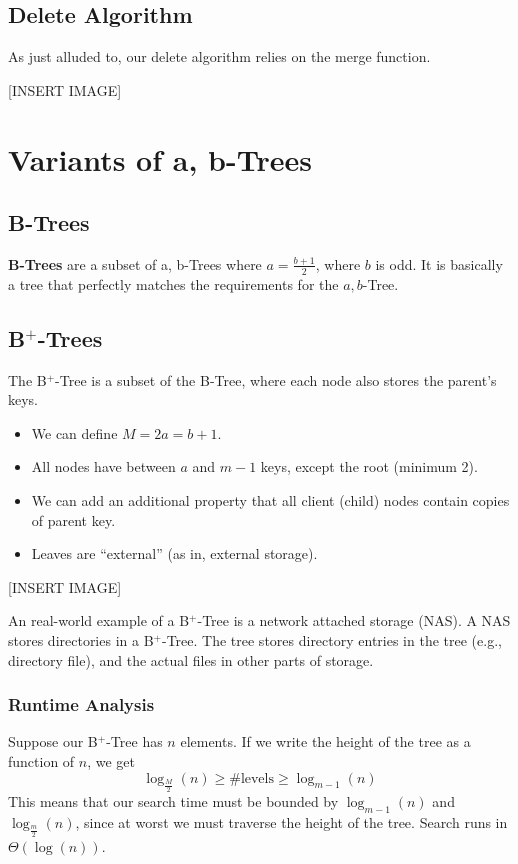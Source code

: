 \documentclass[10pt]{article}
\begin{document}
\subsection*{Delete Algorithm}
As just alluded to, our delete algorithm relies on the merge function.
\begin{center}
    [INSERT IMAGE]
\end{center}

\section*{Variants of a, b-Trees}
\subsection*{B-Trees}
\textbf{B-Trees} are a subset of a, b-Trees where $a = \frac{b + 1}{2}$, where $b$ is odd.  It is basically a tree that perfectly matches the requirements for the $a, b$-Tree.

\subsection*{B$^+$-Trees}
The B$^+$-Tree is a subset of the B-Tree, where each node also stores the parent's keys.
\begin{itemize}
	\item We can define $M = 2a = b + 1$.
	\item All nodes have between $a$ and $m - 1$ keys, except the root (minimum 2).
	\item We can add an additional property that all client (child) nodes contain copies of parent key.
	\item Leaves are ``external'' (as in, external storage).
\end{itemize}

\begin{center}
    [INSERT IMAGE]
\end{center}
An real-world example of a B$^+$-Tree is a network attached storage (NAS).  A NAS stores directories in a B$^+$-Tree.  The tree stores directory entries in the tree (e.g., directory file), and the actual files in other parts of storage.

\subsubsection*{Runtime Analysis}
Suppose our B$^+$-Tree has $n$ elements.  If we write the height of the tree as a function of $n$, we get
\[\log_{\frac{M}{2}}(n) \geq \#\text{levels} \geq \log_{m - 1}(n)\]
This means that our search time must be bounded by $\log_{m - 1}(n)$ and $\log_{\frac{m}{2}}(n)$, since at worst we must traverse the height of the tree.  Search runs in $\Theta(\log(n))$. 
\end{document}
